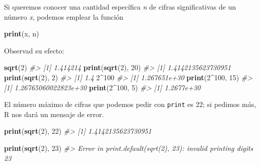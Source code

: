 \documentclass[
]{book}
\newenvironment{Shaded}{\begin{snugshade}}{\end{snugshade}}
\newcommand{\CommentTok}[1]{\textcolor[rgb]{0.56,0.35,0.01}{\textit{#1}}}
\newcommand{\DecValTok}[1]{\textcolor[rgb]{0.00,0.00,0.81}{#1}}
\newcommand{\KeywordTok}[1]{\textcolor[rgb]{0.13,0.29,0.53}{\textbf{#1}}}
\newcommand{\NormalTok}[1]{#1}
\newcommand{\OperatorTok}[1]{\textcolor[rgb]{0.81,0.36,0.00}{\textbf{#1}}}
\theoremstyle{definition}
\theoremstyle{definition}
\theoremstyle{definition}
\theoremstyle{remark}
\begin{document}
Si queremos conocer una cantidad específica \emph{n} de cifras significativas de un número \emph{x}, podemos emplear la función

\begin{Shaded}
\begin{Highlighting}[]
\KeywordTok{print}\NormalTok{(x, n)}
\end{Highlighting}
\end{Shaded}

Observad su efecto:

\begin{Shaded}
\begin{Highlighting}[]
\KeywordTok{sqrt}\NormalTok{(}\DecValTok{2}\NormalTok{)}
\CommentTok{\#\textgreater{} [1] 1.414214}
\KeywordTok{print}\NormalTok{(}\KeywordTok{sqrt}\NormalTok{(}\DecValTok{2}\NormalTok{), }\DecValTok{20}\NormalTok{)}
\CommentTok{\#\textgreater{} [1] 1.4142135623730951}
\KeywordTok{print}\NormalTok{(}\KeywordTok{sqrt}\NormalTok{(}\DecValTok{2}\NormalTok{), }\DecValTok{2}\NormalTok{)}
\CommentTok{\#\textgreater{} [1] 1.4}
\DecValTok{2}\OperatorTok{\^{}}\DecValTok{100}
\CommentTok{\#\textgreater{} [1] 1.267651e+30}
\KeywordTok{print}\NormalTok{(}\DecValTok{2}\OperatorTok{\^{}}\DecValTok{100}\NormalTok{, }\DecValTok{15}\NormalTok{)}
\CommentTok{\#\textgreater{} [1] 1.26765060022823e+30}
\KeywordTok{print}\NormalTok{(}\DecValTok{2}\OperatorTok{\^{}}\DecValTok{100}\NormalTok{, }\DecValTok{5}\NormalTok{)}
\CommentTok{\#\textgreater{} [1] 1.2677e+30}
\end{Highlighting}
\end{Shaded}

El número máximo de cifras que podemos pedir con \texttt{print} es 22; si pedimos más, R nos dará un mensaje de error.

\begin{Shaded}
\begin{Highlighting}[]
\KeywordTok{print}\NormalTok{(}\KeywordTok{sqrt}\NormalTok{(}\DecValTok{2}\NormalTok{), }\DecValTok{22}\NormalTok{)}
\CommentTok{\#\textgreater{} [1] 1.4142135623730951}
\end{Highlighting}
\end{Shaded}

\begin{Shaded}
\begin{Highlighting}[]
\KeywordTok{print}\NormalTok{(}\KeywordTok{sqrt}\NormalTok{(}\DecValTok{2}\NormalTok{), }\DecValTok{23}\NormalTok{)}
\CommentTok{\#\textgreater{} Error in print.default(sqrt(2), 23): invalid printing digits 23}
\end{Highlighting}
\end{Shaded}
\end{document}
